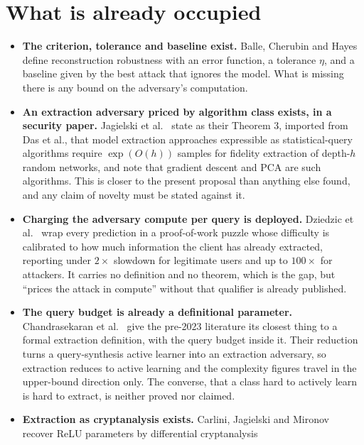 \documentclass[11pt]{article}
\theoremstyle{definition}
\theoremstyle{plain}
\begin{document}
\section{What is already occupied}
\label{sec:prior}

\begin{itemize}
  \item \textbf{The criterion, tolerance and baseline exist.} Balle, Cherubin and
        Hayes~\cite{BCH22} define reconstruction robustness with an error function,
        a tolerance $\eta$, and a baseline given by the best attack that ignores the
        model. What is missing there is any bound on the adversary's computation.
  \item \textbf{An extraction adversary priced by algorithm class exists, in a
        security paper.} Jagielski et al.~\cite{JCBKP20} state as their Theorem 3,
        imported from Das et al., that model extraction approaches expressible as
        statistical-query algorithms require $\exp(O(h))$ samples for fidelity
        extraction of depth-$h$ random networks, and note that gradient descent and
        PCA are such algorithms. This is closer to the present proposal than
        anything else found, and any claim of novelty must be stated against it.
  \item \textbf{Charging the adversary compute per query is deployed.} Dziedzic et
        al.~\cite{DKLP22} wrap every prediction in a proof-of-work puzzle whose
        difficulty is calibrated to how much information the client has already
        extracted, reporting under $2\times$ slowdown for legitimate users and up to
        $100\times$ for attackers. It carries no definition and no theorem, which is
        the gap, but ``prices the attack in compute'' without that qualifier is
        already published.
  \item \textbf{The query budget is already a definitional parameter.}
        Chandrasekaran et al.~\cite{CCGJY19} give the pre-2023 literature its
        closest thing to a formal extraction definition, with the query budget
        inside it. Their reduction turns a query-synthesis active learner into an
        extraction adversary, so extraction reduces to active learning and the
        complexity figures travel in the upper-bound direction only. The converse,
        that a class hard to actively learn is hard to extract, is neither proved
        nor claimed.
  \item \textbf{Extraction as cryptanalysis exists.} Carlini, Jagielski and
        Mironov~\cite{CJM20} recover ReLU parameters by differential cryptanalysis

\end{itemize}
\end{document}
